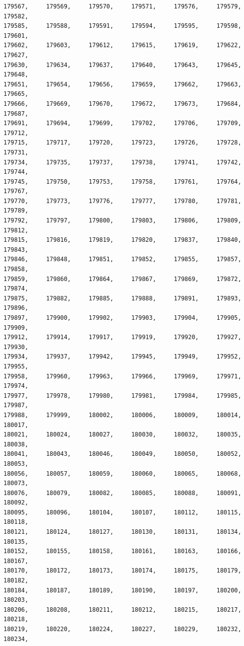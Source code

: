 \documentclass[a4paper,11pt]{report}
\begin{document}
\begin{verbatim}
179567,     179569,     179570,     179571,     179576,     179579,     179582,
179585,     179588,     179591,     179594,     179595,     179598,     179601,
179602,     179603,     179612,     179615,     179619,     179622,     179627,
179630,     179634,     179637,     179640,     179643,     179645,     179648,
179651,     179654,     179656,     179659,     179662,     179663,     179665,
179666,     179669,     179670,     179672,     179673,     179684,     179687,
179691,     179694,     179699,     179702,     179706,     179709,     179712,
179715,     179717,     179720,     179723,     179726,     179728,     179731,
179734,     179735,     179737,     179738,     179741,     179742,     179744,
179745,     179750,     179753,     179758,     179761,     179764,     179767,
179770,     179773,     179776,     179777,     179780,     179781,     179789,
179792,     179797,     179800,     179803,     179806,     179809,     179812,
179815,     179816,     179819,     179820,     179837,     179840,     179843,
179846,     179848,     179851,     179852,     179855,     179857,     179858,
179859,     179860,     179864,     179867,     179869,     179872,     179874,
179875,     179882,     179885,     179888,     179891,     179893,     179896,
179897,     179900,     179902,     179903,     179904,     179905,     179909,
179912,     179914,     179917,     179919,     179920,     179927,     179930,
179934,     179937,     179942,     179945,     179949,     179952,     179955,
179958,     179960,     179963,     179966,     179969,     179971,     179974,
179977,     179978,     179980,     179981,     179984,     179985,     179987,
179988,     179999,     180002,     180006,     180009,     180014,     180017,
180021,     180024,     180027,     180030,     180032,     180035,     180038,
180041,     180043,     180046,     180049,     180050,     180052,     180053,
180056,     180057,     180059,     180060,     180065,     180068,     180073,
180076,     180079,     180082,     180085,     180088,     180091,     180092,
180095,     180096,     180104,     180107,     180112,     180115,     180118,
180121,     180124,     180127,     180130,     180131,     180134,     180135,
180152,     180155,     180158,     180161,     180163,     180166,     180167,
180170,     180172,     180173,     180174,     180175,     180179,     180182,
180184,     180187,     180189,     180190,     180197,     180200,     180203,
180206,     180208,     180211,     180212,     180215,     180217,     180218,
180219,     180220,     180224,     180227,     180229,     180232,     180234,

\end{verbatim}
\end{document}
